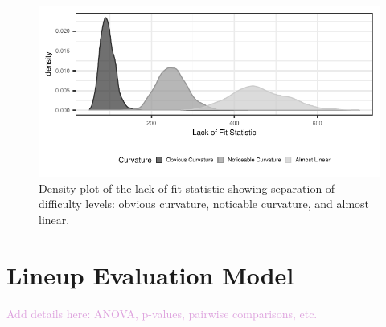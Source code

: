 \documentclass[]{interact}
\theoremstyle{plain}%
\theoremstyle{definition}
\theoremstyle{remark}
\begin{document}
\begin{figure}

{\centering \includegraphics{jsm-2021-student-paper-submission_files/figure-latex/lof-density-curves-1} 

}

\caption{Density plot of the lack of fit statistic showing separation of difficulty levels: obvious curvature, noticable curvature, and almost linear.}\label{fig:lof-density-curves}
\end{figure}

\hypertarget{lineup-evaluation-model}{%
\section{\texorpdfstring{Lineup Evaluation Model
\label{app:glmm-model}}{Lineup Evaluation Model }}\label{lineup-evaluation-model}}

\textcolor{Plum}{Add details here: ANOVA, p-values, pairwise comparisons, etc.}



\end{document}
